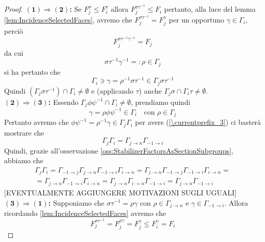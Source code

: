 \documentclass[a4paper,12pt]{report}
\theoremstyle{plain}
\theoremstyle{definition}
\newcommand\localref[1]{\ref{\currentprefix_#1}}
\newcommand\implication[2]{$\bm{(#1)\Rightarrow(#2)}$\textbf{: }}
\begin{document}
\begin{proof}
\implication{1}{2}Se $F_j^\sigma\leq F_i^\tau$ allora $F_j^{\sigma\tau^{-1}}\leq F_i$ pertanto, alla luce del lemma \ref{lem:IncidenceSelectedFaces},
avremo che $F_j^{\sigma\tau^{-1}}=F_j^\gamma$ per un opportuno $\gamma\in\Gamma_i$, perci\`o
\begin{equation*}
F_j^{\sigma\tau^{-1}\gamma^{-1}}=F_j
\end{equation*}
da cui
\begin{equation*}
\sigma\tau^{-1}\gamma^{-1}=:\rho\in\Gamma_j
\end{equation*}
si ha pertanto che
\begin{equation*}
\Gamma_i\ni\gamma=\rho^{-1}\sigma\tau^{-1}\in\Gamma_j\sigma\tau^{-1}
\end{equation*}
Quindi $(\Gamma_j\sigma\tau^{-1})\cap\Gamma_i\neq\emptyset$ e (applicando $\tau$) anche $\Gamma_j\sigma\cap\Gamma_i\tau\neq\emptyset$.\\
\implication{2}{3}Essendo $\Gamma_j\phi\psi^{-1}\cap\Gamma_i\neq\emptyset$, prendiamo quindi
\begin{equation*}
\gamma=\rho\phi\psi^{-1}\in\Gamma_i\quad\text{con }\rho\in\Gamma_j
\end{equation*}
Pertanto avremo che $\phi\psi^{-1}=\rho^{-1}\gamma\in\Gamma_j\Gamma_i$ per avere (\localref{3}) ci baster\`a mostrare che
\begin{equation*}
\Gamma_j\Gamma_i=\Gamma_{j\rightarrow n}\Gamma_{-1\rightarrow i}
\end{equation*}
Quindi, grazie all'osservazione \ref{oss:StabilizerFactorsAsSectionSubgroups}, abbiamo che
\begin{gather*}
\Gamma_j\Gamma_i=\Gamma_{-1\rightarrow j}\Gamma_{j\rightarrow n}\Gamma_{-1\rightarrow i}\Gamma_{i\rightarrow n}=
\Gamma_{j\rightarrow n}\Gamma_{-1\rightarrow j}\Gamma_{-1\rightarrow i}\Gamma_{i\rightarrow n}=\\
=\Gamma_{j\rightarrow n}\Gamma_{-1\rightarrow i}\Gamma_{i\rightarrow n}=\Gamma_{j\rightarrow n}\Gamma_{i\rightarrow n}\Gamma_{-1\rightarrow i}=
\Gamma_{j\rightarrow n}\Gamma_{-1\rightarrow i}
\end{gather*}
[EVENTUALMENTE AGGIUNGERE MOTIVAZIONI SUGLI UGUALI]
\implication{3}{1}Supponiamo che $\sigma\tau^{-1}=\rho\gamma$ con $\rho\in\Gamma_{j\rightarrow n}$ e $\gamma\in\Gamma_{-1\rightarrow i}$. Allora
ricordando \ref{lem:IncidenceSelectedFaces} avremo che
\begin{equation*}
F_j^{\sigma\tau^{-1}}=F_j^{\rho\gamma}=F_j^\gamma\leq F_i^\gamma=F_i
\end{equation*}
\end{proof}
\end{document}
